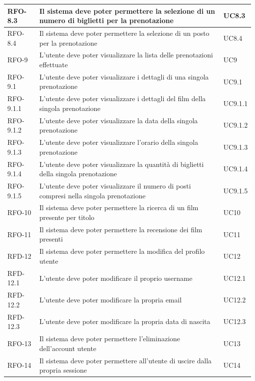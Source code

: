 \begin{center}
\begin{tabularx}{\textwidth}{|>{\hsize=0.4\hsize\centering\arraybackslash}X|>{\hsize=2.2\hsize\centering}X|>{\hsize=0.4\hsize\centering\arraybackslash}X|}
\hline
RFO-8.3 & Il sistema deve poter permettere la selezione di un numero di biglietti per la prenotazione & UC8.3 \\
\hline
RFO-8.4 & Il sistema deve poter permettere la selezione di un posto per la prenotazione & UC8.4 \\
\hline
RFO-9 & L'utente deve poter visualizzare la lista delle prenotazioni effettuate & UC9 \\
\hline
RFO-9.1 & L'utente deve poter visualizzare i dettagli di una singola prenotazione & UC9.1 \\
\hline
RFO-9.1.1 & L'utente deve poter visualizzare i dettagli del film della singola prenotazione & UC9.1.1 \\
\hline
RFO-9.1.2 & L'utente deve poter visualizzare la data della singola prenotazione & UC9.1.2 \\
\hline
RFO-9.1.3 & L'utente deve poter visualizzare l'orario della singola prenotazione & UC9.1.3 \\
\hline
RFO-9.1.4 & L'utente deve poter visualizzare la quantità di biglietti della singola prenotazione & UC9.1.4 \\
\hline
RFO-9.1.5 & L'utente deve poter visualizzare il numero di posti compresi nella singola prenotazione & UC9.1.5 \\
\hline
RFO-10 & Il sistema deve poter permettere la ricerca di un film presente per titolo & UC10 \\
\hline
RFO-11 & Il sistema deve poter permettere la recensione dei film presenti & UC11 \\
\hline
RFD-12 & Il sistema deve poter permettere la modifica del profilo utente & UC12 \\
\hline
RFD-12.1 & L'utente deve poter modificare il proprio username & UC12.1 \\
\hline
RFD-12.2 & L'utente deve poter modificare la propria email & UC12.2 \\
\hline
RFD-12.3 & L'utente deve poter modificare la propria data di nascita & UC12.3 \\
\hline
RFO-13 & Il sistema deve poter permettere l'eliminazione dell'account utente & UC13 \\
\hline
RFO-14 & Il sistema deve poter permettere all'utente di uscire dalla propria sessione & UC14 \\
\hline
\end{tabularx}
\end{center}


